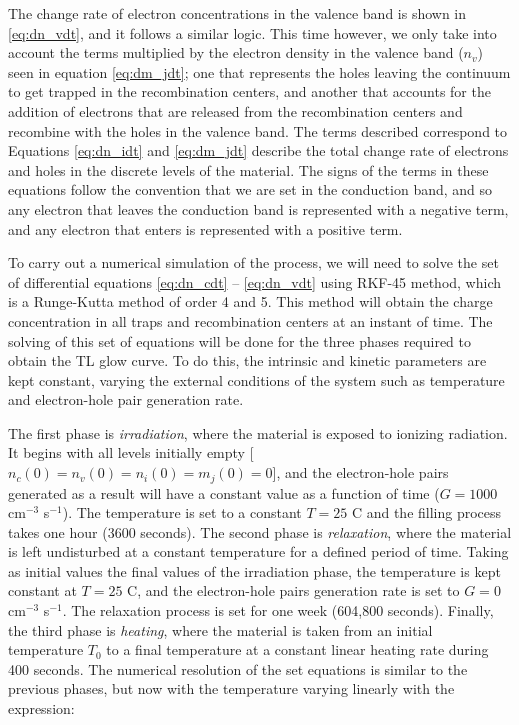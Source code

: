 \vspace{10pt}
The change rate of electron concentrations in the valence band is shown in \ref{eq:dn_vdt}, and it follows a similar logic. This time however, we only take into account the terms multiplied by the electron density in the valence band ($n_v$) seen in equation \ref{eq:dm_jdt}; one that represents the holes leaving the continuum to get trapped in the recombination centers, and another that accounts for the addition of electrons that are released from the recombination centers and recombine with the holes in the valence band. The terms described correspond to Equations \ref{eq:dn_idt} and \ref{eq:dm_jdt} describe the total change rate of electrons and holes in the discrete levels of the material. The signs of the terms in these equations follow the convention that we are set in the conduction band, and so any electron that leaves the conduction band is represented with a negative term, and any electron that enters is represented with a positive term.

\vspace{10pt}

To carry out a numerical simulation of the process, we will need to solve the set of differential equations \ref{eq:dn_cdt} -- \ref{eq:dn_vdt} using RKF-45 method, which is a Runge-Kutta method of order 4 and 5. This method will obtain the charge concentration in all traps and recombination centers at an instant of time. The solving of this set of equations will be done for the three phases required to obtain the TL glow curve. To do this, the intrinsic and kinetic parameters are kept constant, varying the external conditions of the system such as temperature and electron-hole pair generation rate. 

\vspace{10pt}
The first phase is \textit{irradiation}, where the material is exposed to ionizing radiation. It begins with all levels initially empty [$n_c(0) = n_v(0) = n_i(0) = m_j(0) = 0$], and the electron-hole pairs generated as a result will have a constant value as a function of time ($G = 1000$ cm$^{-3}$ s$^{-1}$). The temperature is set to a constant $T = 25$ \textdegree C and the filling process takes one hour (3600 seconds). The second phase is \textit{relaxation}, where the material is left undisturbed at a constant temperature for a defined period of time. Taking as initial values the final values of the irradiation phase, the temperature is kept constant at $T = 25$ \textdegree C, and the electron-hole pairs generation rate is set to $G = 0$ cm$^{-3}$ s$^{-1}$. The relaxation process is set for one week (604,800 seconds). Finally, the third phase is \textit{heating}, where the material is taken from an initial temperature $T_0$ to a final temperature at a constant linear heating rate during 400 seconds. The numerical resolution of the set equations is similar to the previous phases, but now with the temperature varying linearly with the expression:

